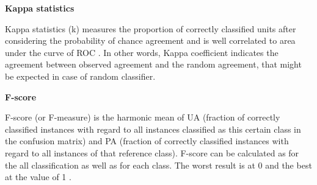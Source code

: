 \documentclass[parskip=full]{scrartcl}
\begin{document}
\textbf{Kappa statistics}

Kappa statistics (k) measures the proportion of correctly classified units after
considering the probability of chance agreement and is well correlated to area
under the curve of ROC \cite{Freeman2012}. In other words, Kappa coefficient
indicates the agreement between observed agreement and the random agreement,
that might be expected in case of random classifier.

\textbf{F-score}

F-score (or F-measure) is the harmonic mean of UA (fraction of correctly
classified instances with regard to all instances classified as this certain
class in the confusion matrix) and PA (fraction of correctly classified
instances with regard to all instances of that reference class). F-score can be
calculated as for the all classification as well as for each class. The worst
result is at 0 and the best at the value of 1 \cite{Inglada2017}.





\end{document}
